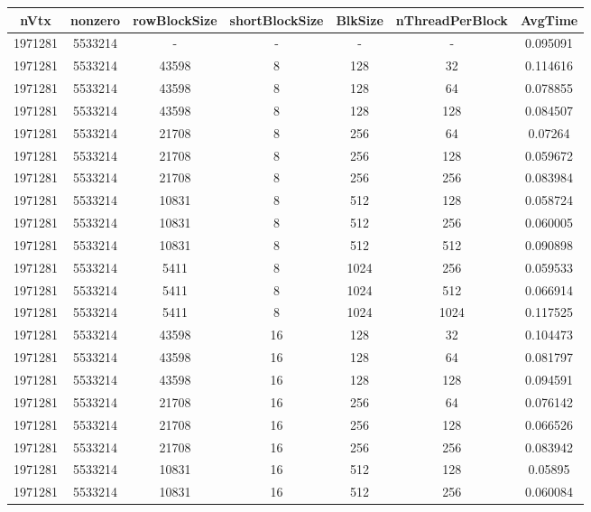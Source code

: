 \documentclass[9pt]{article}
\begin{document}
\SetBgPosition{0.25cm,-5.0cm}
\begin{tabular}{|c|c|c|c|c|c|c| }  
\hline
nVtx  & nonzero  & rowBlockSize  & shortBlockSize  & BlkSize  & nThreadPerBlock  & AvgTime \\
\hline
1971281  & 5533214  &  -  & -  & -  & -  &0.095091 \\
\hline
1971281  & 5533214  & 43598  & 8  & 128  & 32  & 0.114616 \\
\hline
1971281  & 5533214  & 43598  & 8  & 128  & 64  & 0.078855 \\
\hline
1971281  & 5533214  & 43598  & 8  & 128  & 128  & 0.084507 \\
\hline
1971281  & 5533214  & 21708  & 8  & 256  & 64  & 0.07264 \\
\hline
1971281  & 5533214  & 21708  & 8  & 256  & 128  & 0.059672 \\
\hline
1971281  & 5533214  & 21708  & 8  & 256  & 256  & 0.083984 \\
\hline
1971281  & 5533214  & 10831  & 8  & 512  & 128  & 0.058724 \\
\hline
1971281  & 5533214  & 10831  & 8  & 512  & 256  & 0.060005 \\
\hline
1971281  & 5533214  & 10831  & 8  & 512  & 512  & 0.090898 \\
\hline
1971281  & 5533214  & 5411  & 8  & 1024  & 256  & 0.059533 \\
\hline
1971281  & 5533214  & 5411  & 8  & 1024  & 512  & 0.066914 \\
\hline
1971281  & 5533214  & 5411  & 8  & 1024  & 1024  & 0.117525 \\
\hline
1971281  & 5533214  & 43598  & 16  & 128  & 32  & 0.104473 \\
\hline
1971281  & 5533214  & 43598  & 16  & 128  & 64  & 0.081797 \\
\hline
1971281  & 5533214  & 43598  & 16  & 128  & 128  & 0.094591 \\
\hline
1971281  & 5533214  & 21708  & 16  & 256  & 64  & 0.076142 \\
\hline
1971281  & 5533214  & 21708  & 16  & 256  & 128  & 0.066526 \\
\hline
1971281  & 5533214  & 21708  & 16  & 256  & 256  & 0.083942 \\
\hline
1971281  & 5533214  & 10831  & 16  & 512  & 128  & 0.05895 \\
\hline
1971281  & 5533214  & 10831  & 16  & 512  & 256  & 0.060084 \\

\end{tabular}
\end{document}
